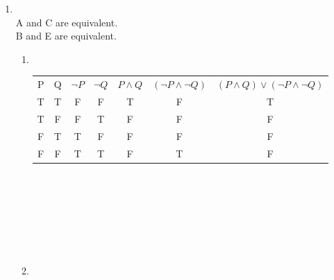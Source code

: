 \documentclass[12pt]{exam}
\begin{document}
\begin{enumerate}
    \addtocounter{enumi}{1}

    \item ~\\
    
        A and C are equivalent.\\
        B and E are equivalent.\\
    
        \begin{enumerate}
        
            \item ~\\
            
                \begin{table}[h]
                    \centering 
                    \label{tab:example_table}
                    
                    \begin{tabular}{ccccccc}
                        
                        P & Q & $ \lnot P $ & $ \lnot Q $ & $  P \land Q $ & $ ( \lnot P \land \lnot Q ) $ & $ ( P \land Q ) \lor ( \lnot P \land \lnot Q ) $ \\
                        
                        T       & T       & F       & F       & T       & F       & T       \\
                        T       & F       & F       & T       & F       & F       & F       \\
                        F       & T       & T       & F       & F       & F       & F       \\
                        F       & F       & T       & T       & F       & T       & F       \\
                        
                        
                    \end{tabular}
                \end{table}   
~\\
~\\
~\\
~\\
~\\
~\\    
            \item ~\\
            
                \begin{table}[h]
                    \centering 
                    \label{tab:example_table}
                    

\end{table}
\end{enumerate}
\end{enumerate}
\end{document}

